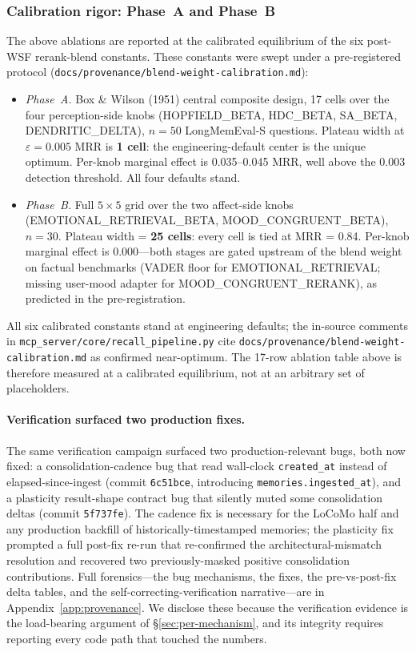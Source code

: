 \documentclass[11pt]{article}
\begin{document}
\subsubsection{Calibration rigor: Phase~A and Phase~B}
\label{sec:calibration}

The above ablations are reported at the calibrated equilibrium of
the six post-WSF rerank-blend constants.  These constants were
swept under a pre-registered protocol
(\texttt{docs/provenance/blend-weight-calibration.md}):

\begin{itemize}
\item \emph{Phase~A.}  Box \& Wilson (1951) central composite design,
  17 cells over the four perception-side knobs (HOPFIELD\_BETA,
  HDC\_BETA, SA\_BETA, DENDRITIC\_DELTA), $n = 50$ LongMemEval-S
  questions.  Plateau width at $\varepsilon = 0.005$ MRR is
  \textbf{1 cell}: the engineering-default center is the unique
  optimum.  Per-knob marginal effect is 0.035--0.045 MRR, well above
  the 0.003 detection threshold.  All four defaults stand.
\item \emph{Phase~B.}  Full $5{\times}5$ grid over the two
  affect-side knobs (EMOTIONAL\_RETRIEVAL\_BETA,
  MOOD\_CONGRUENT\_BETA), $n = 30$.  Plateau width = \textbf{25
  cells}: every cell is tied at MRR = 0.84.  Per-knob marginal
  effect is 0.000---both stages are gated upstream of the blend
  weight on factual benchmarks (VADER floor for
  EMOTIONAL\_RETRIEVAL; missing user-mood adapter for
  MOOD\_CONGRUENT\_RERANK), as predicted in the pre-registration.
\end{itemize}

All six calibrated constants stand at engineering defaults; the
in-source comments in \texttt{mcp\_server/core/recall\_pipeline.py}
cite \texttt{docs/provenance/blend-weight-calibration.md} as confirmed
near-optimum.  The 17-row ablation table above is therefore
measured at a calibrated equilibrium, not at an arbitrary set of
placeholders.

\paragraph{Verification surfaced two production fixes.}
The same verification campaign surfaced two production-relevant bugs,
both now fixed: a consolidation-cadence bug that read wall-clock
\texttt{created\_at} instead of elapsed-since-ingest (commit
\texttt{6c51bce}, introducing \texttt{memories.ingested\_at}), and a
plasticity result-shape contract bug that silently muted some
consolidation deltas (commit \texttt{5f737fe}).  The cadence fix is
necessary for the LoCoMo half and any production backfill of
historically-timestamped memories; the plasticity fix prompted a
full post-fix re-run that re-confirmed the architectural-mismatch
resolution and recovered two previously-masked positive
consolidation contributions.  Full forensics---the bug mechanisms,
the fixes, the pre-vs-post-fix delta tables, and the
self-correcting-verification narrative---are in
Appendix~\ref{app:provenance}.  We disclose these because the
verification evidence is the load-bearing argument of
\S\ref{sec:per-mechanism}, and its integrity requires reporting every
code path that touched the numbers.
\end{document}
